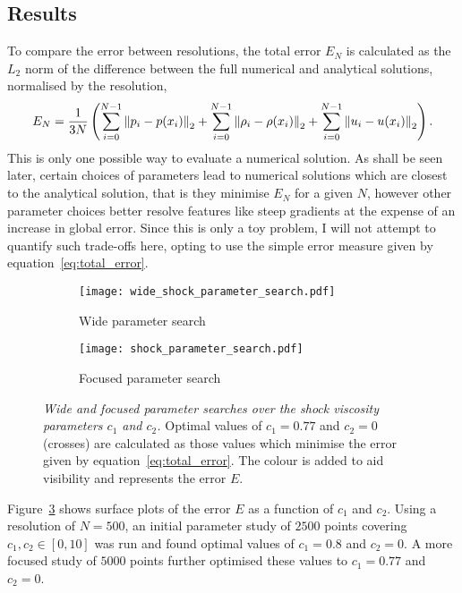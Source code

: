 \subsection{Results}

To compare the error between resolutions, the total error $E_N$ is calculated as the $L_2$ norm of the difference between the full numerical and analytical solutions, normalised by the resolution,
\begin{equation}
  \label{eq:total_error}
E_N = \frac{1}{3N} \left(
\sum_{i=0}^{N-1} \left\lVert p_i - p(x_i)\right\rVert_2
+ \sum_{i=0}^{N-1} \left\lVert\rho_i - \rho(x_i)\right\rVert_2
+ \sum_{i=0}^{N-1} \left\lVert u_i - u(x_i)\right\rVert_2 \right).
\end{equation}
This is only one possible way to evaluate a numerical solution. As shall be seen later, certain choices of parameters lead to numerical solutions which are closest to the analytical solution, that is they minimise $E_N$ for a given $N$, however other parameter choices better resolve features like steep gradients at the expense of an increase in global error. Since this is only a toy problem, I will not attempt to quantify such trade-offs here, opting to use the simple error measure given by equation~\eqref{eq:total_error}.

\begin{figure}[t]
    \hfill
    \begin{subfigure}{0.49\textwidth}
      \centering
      \texttt{[image: wide\_shock\_parameter\_search.pdf]}
      \caption{Wide parameter search}%
      \label{fig:wide_shock_parameter_search}
    \end{subfigure}
    \hfill
    \begin{subfigure}{0.49\textwidth}
      \texttt{[image: shock\_parameter\_search.pdf]}
      \caption{Focused parameter search}%
      \label{fig:shock_parameter_search}
    \end{subfigure}
    \caption{\emph{Wide and focused parameter searches over the shock viscosity parameters $c_1$ and $c_2$.} Optimal values of $c_1 = 0.77$ and $c_2 = 0$ (crosses) are calculated as those values which minimise the error given by equation~\eqref{eq:total_error}. The colour is added to aid visibility and represents the error $E$. }
\label{fig:shock_parameter_searches}%
\end{figure}

Figure~\ref{fig:shock_parameter_searches} shows surface plots of the error $E$ as a function of $c_1$ and $c_2$. Using a resolution of $N=500$, an initial parameter study of $2500$ points covering $c_1, c_2 \in [0, 10]$ was run and found optimal values of $c_1 = 0.8$ and $c_2 = 0$. A more focused study of $5000$ points further optimised these values to $c_1 = 0.77$ and $c_2 = 0$.

